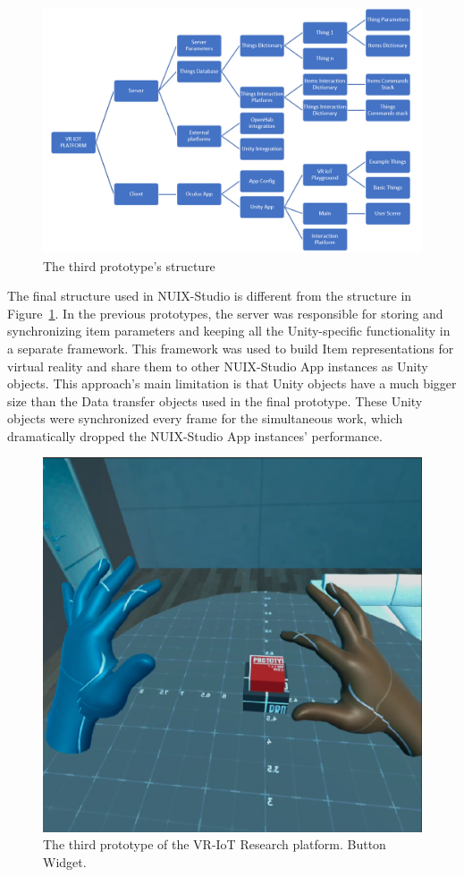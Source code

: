 \begin{figure}
  \centering
  \includegraphics[width=0.9\linewidth]{figures/Prototype3Structure.png}
  \caption{The third prototype's structure}
  \label{fig:Prototype3Structure-figure}
\end{figure}

The final structure used in NUIX-Studio is different from the structure in Figure~\ref{fig:Prototype3Structure-figure}. In the previous prototypes, the server was responsible for storing and synchronizing item parameters and keeping all the Unity-specific functionality in a separate framework. This framework was used to build Item representations for virtual reality and share them to other NUIX-Studio App instances as Unity objects. This approach's main limitation is that Unity objects have a much bigger size than the Data transfer objects used in the final prototype. These Unity objects were synchronized every frame for the simultaneous work, which dramatically dropped the NUIX-Studio App instances' performance.

\begin{figure}
  \centering
  \includegraphics[width=0.6\linewidth]{figures/Prototype3.png}
  \caption{The third prototype of the VR-IoT Research platform. Button Widget.}
  \label{fig:Prototype3-figure}
\end{figure}

